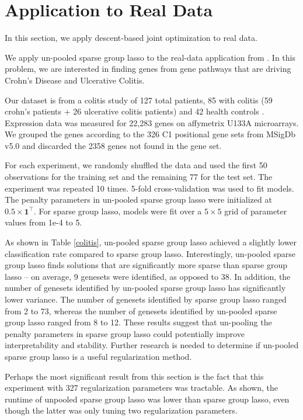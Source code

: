 \documentclass[10pt,letterpaper]{article}
\begin{document}
\section{Application to Real Data}
In this section, we apply descent-based joint optimization to real data.

We apply un-pooled sparse group lasso to the real-data application from \citet{simon2013sparse}. In this problem, we are interested in finding genes from gene pathways that are driving Crohn's Disease and Ulcerative Colitis.

Our dataset is from a colitis study of 127 total patients, 85 with colitis (59 crohn's patients + 26 ulcerative colitis patients) and 42 health controls \citep{burczynski2006molecular}. Expression data was measured for 22,283 genes on affymetrix U133A microarrays. We grouped the genes according to the 326 C1 positional gene sets from MSigDb v5.0 \citep{subramanian2005gene} and discarded the 2358 genes not found in the gene set.

For each experiment, we randomly shuffled the data and used the first 50 observations for the training set and the remaining 77 for the test set. The experiment was repeated 10 times. 5-fold cross-validation was used to fit models. The penalty parameters in un-pooled sparse group lasso were initialized at $0.5 \times \boldsymbol 1^\top$. For sparse group lasso, models were fit over a $5 \times 5$ grid of parameter values from 1e-4 to 5.

As shown in Table \ref{colitis}, un-pooled sparse group lasso achieved a slightly lower classification rate compared to sparse group lasso. Interestingly, un-pooled sparse group lasso finds solutions that are significantly more sparse than sparse group lasso -- on average, 9 genesets were identified, as opposed to 38. In addition, the number of genesets identified by un-pooled sparse group lasso has significantly lower variance. The number of genesets identified by sparse group lasso ranged from 2 to 73, whereas the number of genesets identified by un-pooled sparse group lasso ranged from 8 to 12. These results suggest that un-pooling the penalty parameters in sparse group lasso could potentially improve interpretability and stability. Further research is needed to determine if un-pooled sparse group lasso is a useful regularization method.

Perhaps the most significant result from this section is the fact that this experiment with 327 regularization parameters was tractable. As shown, the runtime of unpooled sparse group lasso was lower than sparse group lasso, even though the latter was only tuning two regularization parameters.
\end{document}

